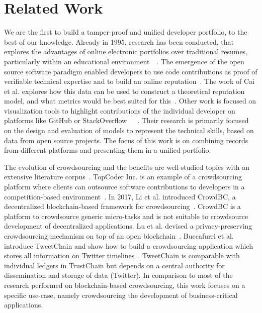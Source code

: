 \section{Related Work}
We are the first to build a tamper-proof and unified developer portfolio, to the best of our knowledge.
Already in 1995, research has been conducted, that explores the advantages of online electronic portfolios over traditional resumes, particularly within an educational environment~\cite{riggsby1995electronic}~\cite{barrett2000electronic}.
The emergence of the open source software paradigm enabled developers to use code contributions as proof of verifiable technical expertise and to build an online reputation~\cite{riehle2015open}.
The work of Cai et al. explores how this data can be used to construct a theoretical reputation model, and what metrics would be best suited for this~\cite{cai2016reputation}.
Other work is focused on visualization tools to highlight contributions of the individual developer on platforms like GitHub or StackOverflow~\cite{jaruchotrattanasakul2016open}~\cite{saxena2017know}~\cite{chen2016supporting}.
Their research is primarily focused on the design and evaluation of models to represent the technical skills, based on data from open source projects.
The focus of this work is on combining records from different platforms and presenting them in a unified portfolio.

The evolution of crowdsourcing and the benefits are well-studied topics with an extensive literature corpus~\cite{latoza2016crowdsourcing}.
TopCoder Inc. is an example of a crowdsourcing platform where clients can outsource software contributions to developers in a competition-based environment~\cite{lakhani2010topcoder}.
In 2017, Li et al. introduced CrowdBC, a decentralized blockchain-based framework for crowdsourcing~\cite{li2017crowdbc}.
CrowdBC is a platform to crowdsource generic micro-tasks and is not suitable to crowdsource development of decentralized applications.
Lu et al. devised a privacy-preserving crowdsourcing mechanism on top of an open blockchain~\cite{lu2018zebralancer}.
Buccafurri et al. introduce TweetChain and show how to build a crowdsourcing application which stores all information on Twitter timelines~\cite{buccafurri2017tweetchain}.
TweetChain is comparable with individual ledgers in TrustChain but depends on a central authority for dissemination and storage of data (Twitter).
In comparison to most of the research performed on blockchain-based crowdsourcing, this work focuses on a specific use-case, namely crowdsourcing the development of business-critical applications.

